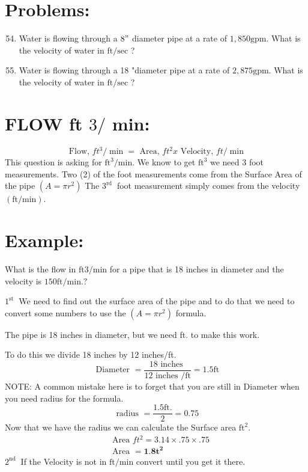 \begin{enumerate}
\section{Problems:}
\begin{enumerate}
  \setcounter{enumi}{53}
  \item Water is flowing through a $8 "$ diameter pipe at a rate of $1,850 \mathrm{gpm}$. What is the velocity of water in $\mathrm{ft} / \mathrm{sec}$ ?

  \item Water is flowing through a 18 "diameter pipe at a rate of $2,875 \mathrm{gpm}$. What is the velocity of water in $\mathrm{ft} / \mathrm{sec}$ ?

\end{enumerate}
\section{FLOW ft $3 /$ min:}
$$
\text { Flow, } f t^{3} / \min =\text { Area, } f t^{2} x \text { Velocity, } f t / \min
$$
This question is asking for $\mathrm{ft}^{3} / \mathrm{min}$. We know to get $\mathrm{ft}^{3}$ we need 3 foot measurements. Two (2) of the foot measurements come from the Surface Area of the pipe $\left(A=\pi r^{2}\right)$ The $3^{\text {rd }}$ foot measurement simply comes from the velocity $(\mathrm{ft} / \mathrm{min})$.

\section{Example:}
What is the flow in $\mathrm{ft} 3 / \mathrm{min}$ for a pipe that is 18 inches in diameter and the velocity is $150 \mathrm{ft} / \mathrm{min} . ?$

$1^{\text {st }}$ We need to find out the surface area of the pipe and to do that we need to convert some numbers to use the $\left(A=\pi r^{2}\right)$ formula.

The pipe is 18 inches in diameter, but we need ft. to make this work.

To do this we divide 18 inches by 12 inches/ft.
$$
\text { Diameter }=\frac{18 \text { inches }}{12 \text { inches } / \mathrm{ft}}=1.5 \mathrm{ft}
$$
NOTE: A common mistake here is to forget that you are still in Diameter when you need radius for the formula.
$$
\text { radius }=\frac{1.5 \mathrm{ft} .}{2}=0.75
$$
Now that we have the radius we can calculate the Surface area $\mathrm{ft}^{2}$.
$$
\begin{aligned}
&\text { Area } f t^{2}=3.14 \times .75 \times .75 \\
&\text { Area }=\mathbf{1 . 8 t ^ { 2 }}
\end{aligned}
$$
$2^{\text {nd }}$ If the Velocity is not in $\mathrm{ft} / \mathrm{min}$ convert until you get it there.


\end{enumerate}
